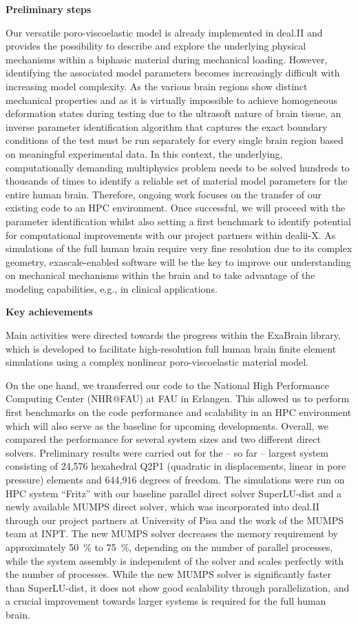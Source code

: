 \documentclass[a4paper,12pt, numbers]{article}
\begin{document}
\noindent\textbf{Preliminary steps}

Our versatile poro-viscoelastic model is already implemented in deal.II and provides the possibility to describe and explore the underlying physical mechanisms within a biphasic material during mechanical loading.
However, identifying the associated model parameters becomes increasingly difficult with increasing model complexity.
As the various brain regions show distinct mechanical properties and as it is virtually impossible to achieve homogeneous deformation states during testing due to the ultrasoft nature of brain tissue, an inverse parameter identification algorithm that captures the exact boundary conditions of the test must be run separately for every single brain region based on meaningful experimental data.
In this context, the underlying, computationally demanding multiphysics problem needs to be solved hundreds to thousands of times to identify a reliable set of material model parameters for the entire human brain.
Therefore, ongoing work focuses on the transfer of our existing code to an HPC environment.
Once successful, we will proceed with the parameter identification whilst also setting a first benchmark to identify potential for computational improvements with our project partners within dealii-X.
As simulations of the full human brain require very fine resolution due to its complex geometry, exascale-enabled software will be the key to improve our understanding on mechanical mechanisms within the brain and to take advantage of the modeling capabilities, e.g., in clinical applications.

\noindent\textbf{Key achievements}

Main activities were directed towards the progress within the ExaBrain library, which is developed to facilitate high-resolution full human brain finite element simulations using a complex nonlinear poro-viscoelastic material model.

On the one hand, we transferred our code to the National High Performance Computing Center (NHR@FAU) at FAU in Erlangen. This allowed us to perform first benchmarks on the code performance and scalability in an HPC environment which will also serve as the baseline for upcoming developments. Overall, we compared the performance for several system sizes and two different direct solvers. Preliminary results were carried out for the -- so far -- largest system consisting of 24,576 hexahedral Q2P1 (quadratic in displacements, linear in pore pressure) elements and 644,916 degrees of freedom. The simulations were run on HPC system ``Fritz'' with our baseline parallel direct solver SuperLU-dist and a newly available MUMPS direct solver, which was incorporated into deal.II through our project partners at University of Pisa and the work of the MUMPS team at INPT. The new MUMPS solver decreases the memory requirement by approximately \SI{50}{\percent} to \SI{75}{\percent}, depending on the number of parallel processes, while the system assembly is independent of the solver and scales perfectly with the number of processes.  While the new MUMPS solver is significantly faster than SuperLU-dist, it does not show good scalability through parallelization, and a crucial improvement towards larger systems is required for the full human brain.
\end{document}
